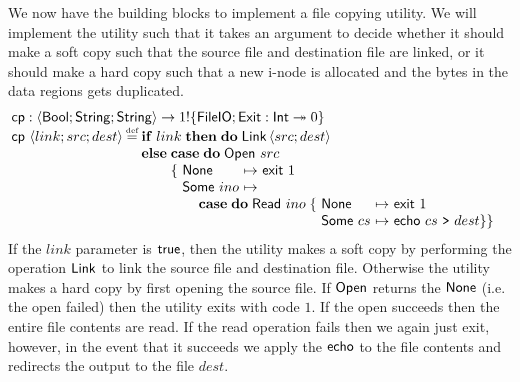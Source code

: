 \documentclass[12pt,phd,lfcs,twoside,openright,logo,leftchapter,normalheadings]{infthesis}
\theoremstyle{plain}
\theoremstyle{definition}
\begin{document}
We now have the building blocks to implement a file copying
utility. We will implement the utility such that it takes an argument
to decide whether it should make a soft copy such that the source file
and destination file are linked, or it should make a hard copy such
that a new i-node is allocated and the bytes in the data regions gets
duplicated.
%
\[
  \bl
    \dec{cp} : \Record{\Bool;\String;\String} \to \UnitType \eff \{\FileIO;\Exit : \Int \opto \ZeroType\}\\
    \dec{cp}~\Record{link;src;dest} \defas
      \bl
        \If\;link\;\Then\;\Do\;\ULink\,\Record{src;dest}\;\\
        \Else\; \bl
        \Case\;\Do\;\UOpen~src\\
         \{ \ba[t]{@{~}l@{~}c@{~}l}
              \None &\mapsto& \exit~1\\
              \Some~ino &\mapsto& \\
              \multicolumn{3}{l}{\quad\Case\;\Do\;\URead~ino\;\{
                \ba[t]{@{~}l@{~}c@{~}l}
                  \None &\mapsto& \exit~1\\
                  \Some~cs &\mapsto& \echo~cs~\redirect~dest \} \}
                \ea}
             \ea
         \el
      \el
  \el
\]
%
If the $link$ parameter is $\mathsf{true}$, then the utility makes a soft copy
by performing the operation $\mathsf{Link}$ to link the source file and
destination file. Otherwise the utility makes a hard copy by first
opening the source file. If $\mathsf{Open}$ returns the $\mathsf{None}$ (i.e. the
open failed) then the utility exits with code $1$. If the open
succeeds then the entire file contents are read. If the read operation
fails then we again just exit, however, in the event that it succeeds
we apply the $\mathsf{echo}$ to the file contents and redirects the output to
the file $dest$.
\end{document}
